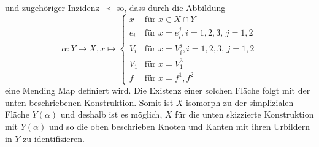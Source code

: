 \documentclass[12pt,titlepage]{article}
\begin{document}
und zugehöriger Inzidenz $\prec$ 
so, dass durch die Abbildung 
\[
\alpha: Y \to X ,x \mapsto 
\begin{cases}
x & \text{für } x\in X \cap Y\\
e_i & \text{für } x =e_i^j ,i=1,2,3,\,j=1,2\\
V_i &\text{für } x =V_i^j,i=1,2,3,\,j=1,2\\
V_1 &\text{für } x=V_1^3\\
f &\text{für } x=f^1,f^2 
\end{cases}
\]
eine Mending Map definiert wird. Die Existenz einer solchen Fläche folgt mit der unten beschriebenen Konstruktion. Somit ist $X$ isomorph zu der simplizialen Fläche $Y(\alpha)$ und deshalb ist es möglich, $X$ für die unten skizzierte Konstruktion mit $Y(\alpha)$ und so die oben beschrieben Knoten und Kanten  mit ihren Urbildern in $Y$ zu identifizieren. \\
\end{document}
